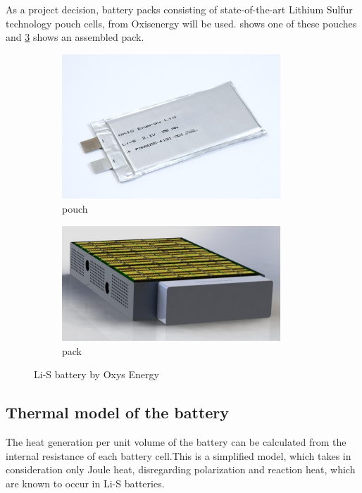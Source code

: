 As a project decision, battery packs consisting of state-of-the-art Lithium Sulfur technology pouch cells, from Oxisenergy will be used.  shows one of these pouches and \cref{fig:pack} shows an assembled pack.

\begin{figure}
    \centering
    \begin{subfigure}{0.45\textwidth}
    \includegraphics[width=0.9\textwidth]{fig/pouch.jpg}
    \caption{pouch}
    \label{fig:pouch}
    \end{subfigure}
    \begin{subfigure}{0.45\textwidth}
    \centering
    \includegraphics[width=0.9\textwidth]{fig/pack.jpg}
    \caption{pack}
    \label{fig:pack}
    \end{subfigure}
    \caption{Li-S battery by Oxys Energy}
\end{figure}

\subsection{Thermal model of the battery}
The heat generation per unit volume of the battery can be calculated from the internal resistance of each battery cell.This is a simplified model, which takes in consideration only Joule heat, disregarding polarization and reaction heat, which are known to occur in Li-S batteries.\cite{samba2015battery}

